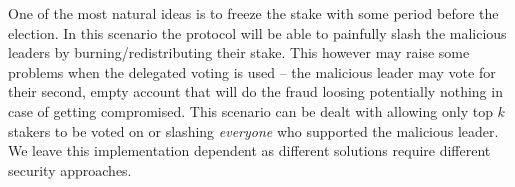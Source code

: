 One of the most natural ideas is to freeze the stake with some period before the
election. In this scenario the protocol will be able to painfully slash the
malicious leaders by burning/redistributing their stake. This however may raise
some problems when the delegated voting is used – the malicious leader may vote
for their second, empty account that will do the fraud loosing potentially
nothing in case of getting compromised. This scenario can be dealt with allowing only
top $k$ stakers to be voted on or slashing \textit{everyone} who supported the
malicious leader. We leave this implementation dependent as different solutions
require different security approaches.